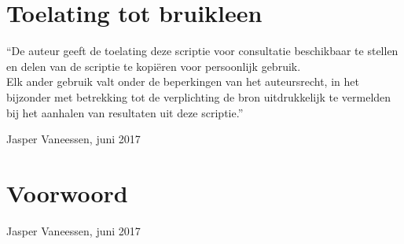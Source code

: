 
\chapter*{Toelating tot bruikleen}

\vspace{1.5cm}

\noindent
``De auteur geeft de toelating deze scriptie voor consultatie beschikbaar
te stellen en delen van de scriptie te kopi\"eren voor persoonlijk
gebruik.\\
Elk ander gebruik valt onder de beperkingen van het auteursrecht,
in het bijzonder met betrekking tot de verplichting de bron uitdrukkelijk
te vermelden bij het aanhalen van resultaten uit deze scriptie.''

\addvspace{4cm}

\noindent Jasper Vaneessen, juni 2017

\chapter{Voorwoord}

\begin{slshape}
\renewcommand{\baselinestretch}{1.2}
\small\normalsize


\addvspace{4cm}

\noindent Jasper Vaneessen, juni 2017
\end{slshape}

